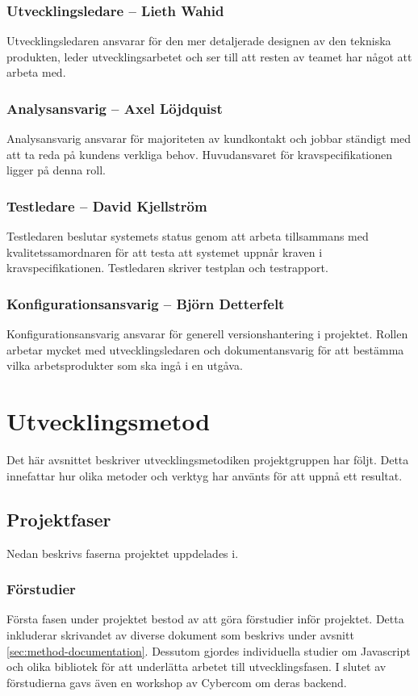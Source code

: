 \subsubsection*{Utvecklingsledare -- Lieth Wahid}
Utvecklingsledaren ansvarar för den mer detaljerade designen av den tekniska produkten, leder utvecklingsarbetet och ser till att resten av teamet har något att arbeta med.

\subsubsection*{Analysansvarig -- Axel Löjdquist}
Analysansvarig ansvarar för majoriteten av kundkontakt och jobbar ständigt med att ta reda på kundens verkliga behov. Huvudansvaret för kravspecifikationen ligger på denna roll.

\subsubsection*{Testledare -- David Kjellström}
Testledaren beslutar systemets status genom att arbeta tillsammans med kvalitetssamordnaren för att testa att systemet uppnår kraven i kravspecifikationen. Testledaren skriver testplan och testrapport.

\subsubsection*{Konfigurationsansvarig -- Björn Detterfelt}
Konfigurationsansvarig ansvarar för generell versionshantering i projektet. Rollen arbetar mycket med utvecklingsledaren och dokumentansvarig för att bestämma vilka arbetsprodukter som ska ingå i en utgåva.

\section{Utvecklingsmetod}
Det här avsnittet beskriver utvecklingsmetodiken projektgruppen har följt. Detta innefattar hur olika metoder och verktyg har använts för att uppnå ett resultat.

\subsection{Projektfaser}
Nedan beskrivs faserna projektet uppdelades i.

\subsubsection*{Förstudier}
Första fasen under projektet bestod av att göra förstudier inför projektet. Detta inkluderar skrivandet av diverse dokument som beskrivs under avsnitt \ref{sec:method-documentation}. Dessutom gjordes individuella studier om Javascript och olika bibliotek för att underlätta arbetet till utvecklingsfasen. I slutet av förstudierna gavs även en workshop av Cybercom om deras backend.

